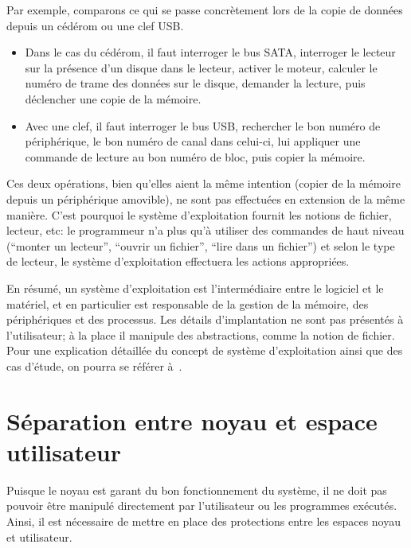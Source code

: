 Par exemple, comparons ce qui se passe concrètement lors de la copie de données
depuis un cédérom ou une clef USB.\@

\begin{itemize}

  \item Dans le cas du cédérom, il faut interroger le bus SATA, interroger le
    lecteur sur la présence d'un disque dans le lecteur, activer le moteur,
    calculer le numéro de trame des données sur le disque, demander la lecture,
    puis déclencher une copie de la mémoire.

  \item Avec une clef, il faut interroger le bus USB, rechercher le bon numéro
    de périphérique, le bon numéro de canal dans celui-ci, lui appliquer une
    commande de lecture au bon numéro de bloc, puis copier la mémoire.

\end{itemize}

Ces deux opérations, bien qu'elles aient la même intention (copier de la mémoire
depuis un périphérique amovible), ne sont pas effectuées en extension de la même
manière. C'est pourquoi le système d'exploitation fournit les notions de
fichier, lecteur, etc: le programmeur n'a plus qu'à utiliser des commandes de
haut niveau (``monter un lecteur'', ``ouvrir un fichier'', ``lire dans un
fichier'') et selon le type de lecteur, le système d'exploitation effectuera les
actions appropriées.

En résumé, un système d'exploitation est l'intermédiaire entre le logiciel et le
matériel, et en particulier est responsable de la gestion de la mémoire, des
périphériques et des processus. Les détails d'implantation ne sont pas présentés
à l'utilisateur; à la place il manipule des abstractions, comme la notion de
fichier. Pour une explication détaillée du concept de système d'exploitation
ainsi que des cas d'étude, on pourra se référer à~\cite{tanenbaum}.

\section{Séparation entre noyau et espace utilisateur}

Puisque le noyau est garant du bon fonctionnement du système, il ne doit pas
pouvoir être manipulé directement par l'utilisateur ou les programmes exécutés.
Ainsi, il est nécessaire de mettre en place des protections entre les espaces
noyau et utilisateur.

